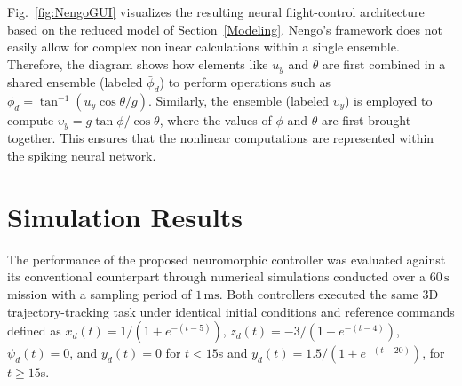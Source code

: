\documentclass[conference]{IEEEtran}
\begin{document}

Fig.~\ref{fig:NengoGUI} visualizes the resulting neural flight-control architecture based on the reduced model of Section~\ref{Modeling}. Nengo's framework does not easily allow for complex nonlinear calculations within a single ensemble. Therefore, the diagram shows how elements like $u_y$ and $\theta$ are first combined in a shared ensemble (labeled $\bar{\phi}_d$) to perform operations such as $\phi_d = \tan^{-1}(u_y \cos\theta / g)$. Similarly, the ensemble (labeled $\upsilon_y$) is employed to compute $\upsilon_y = g \tan\phi / \cos\theta$, where the values of $\phi$ and $\theta$ are first brought together. This ensures that the nonlinear computations are represented within the spiking neural network.



\section{Simulation Results}\label{Simulations}
The performance of the proposed neuromorphic controller was evaluated against its conventional counterpart through numerical simulations conducted over a $60\,\mathrm{s}$ mission with a sampling period of $1\,\mathrm{ms}$. Both controllers executed the same 3D trajectory-tracking task under identical initial conditions and reference commands defined as $x_d(t) = {1}/(1+e^{-(t-5)})$, $z_d(t) = {-3}/(1+e^{-(t-4)})$, $\psi_d(t) = 0$, and $y_d(t) =0$ for $t < 15$s and  $y_d(t)= {1.5}/(1+e^{-(t-20)})$, for $t \ge 15$s.
\end{document}
